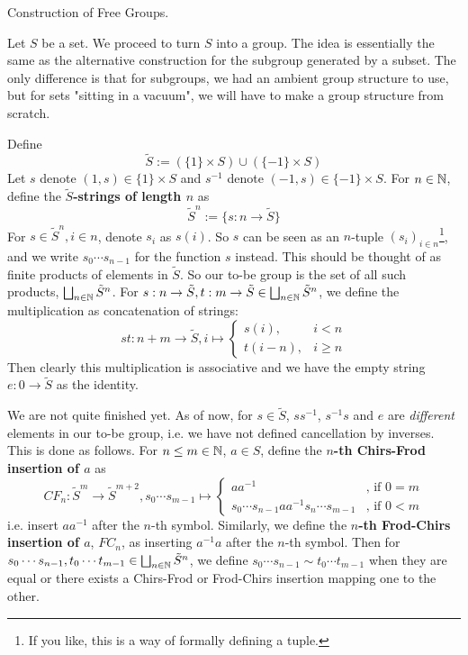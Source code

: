 \documentclass[../book.tex]{subfiles}
\begin{document}
\begin{ex} [Skippable] Construction of Free Groups. 

    Let $S$ be a set. We proceed to turn $S$ into a group.
    The idea is essentially the same as the alternative 
    construction for the subgroup generated by a subset.
    The only difference is that for subgroups, 
    we had an ambient group structure to use,
    but for sets "sitting in a vacuum", 
    we will have to make a group structure from scratch.
    
    Define 
    \[\tilde{S} := (\{1\}\times S) \cup (\{-1\}\times S)\]
    Let $s$ denote $(1,s) \in \{1\} \times S$ and
    $s^{-1}$ denote $(-1,s) \in \{-1\} \times S$. 
    For $n \in \mathbb{N}$, define the \textbf{$\tilde{S}$-strings of length $n$} as
    \[
        \tilde{S}^n := \{ s : n \to \tilde{S} \}
    \]
    For $s \in \tilde{S}^n, i \in n$, denote $s_i$ as $s(i)$.
    So $s$ can be seen as an $n$-tuple $(s_i)_{i \in n}$\footnote{If you like,
    this is a way of formally
    defining a tuple.},
    and we write $s_0\cdots s_{n-1}$ for the function $s$ instead.
    This should be thought of as finite products of elements in $\tilde{S}$.
    So our to-be group is the set of all such products, 
    $\bigsqcup_{n \in \mathbb{N}} \tilde{S}^n$.
    For 
    $s : n \to \tilde{S}, t : m \to \tilde{S} \in \bigsqcup_{n \in \mathbb{N}} \tilde{S}^n$,
    we define the multiplication as concatenation of strings: 
    \[
        st : n+m \to \tilde{S}, i \mapsto 
        \begin{cases}
            s(i), & i < n \\
            t(i-n), & i \geq n
        \end{cases}
    \]
    Then clearly this multiplication is associative and 
    we have the empty string $e : 0 \to \tilde{S}$ as the identity. 
    
    We are not quite finished yet.
    As of now, for $s \in \tilde{S}$, 
    $ss^{-1}$, $s^{-1}s$ and $e$ are \emph{different} elements in our to-be group,
    i.e. we have not defined cancellation by inverses. 
    This is done as follows. 
    For $n \leq m \in \mathbb{N}$, $a \in S$,  
    define the \textbf{$n$-th Chirs-Frod insertion of $a$}
    as 
    \[
        CF_n : \tilde{S}^m \to \tilde{S}^{m+2}, 
        s_0\cdots s_{m-1} \mapsto 
        \begin{cases}
        aa^{-1} & \text{, if } 0 = m\\
        s_0 \cdots s_{n-1} a a^{-1} s_n \cdots s_{m-1} & \text{, if } 0 < m
        \end{cases}
    \]
    i.e. insert $aa^{-1}$ after the $n$-th symbol. 
    Similarly, we define the \textbf{$n$-th Frod-Chirs insertion of $a$}, $FC_n$, 
    as inserting $a^{-1}a$ after the $n$-th symbol. 
    Then for 
    $s_0\cdots s_{n-1}, t_0\cdots t_{m-1} \in \bigsqcup_{n \in \mathbb{N}} \tilde{S}^n$, 
    we define $s_0\cdots s_{n-1} \sim t_0\cdots t_{m-1}$ when
    they are equal or there exists a Chirs-Frod or Frod-Chirs insertion
    mapping one to the other. 
    

\end{ex}
\end{document}
